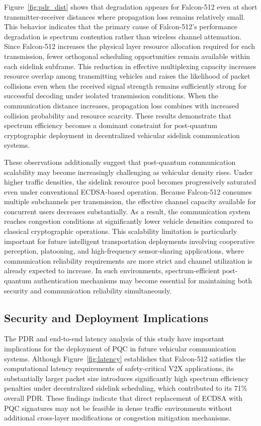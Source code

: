 \documentclass[conference]{IEEEtran}
\begin{document}
Figure~\ref{fig:pdr_dist} shows that degradation appears for Falcon-512 even at short transmitter-receiver distances where propagation loss remains relatively small. This behavior indicates that the primary cause of Falcon-512's performance degradation is spectrum contention rather than wireless channel attenuation. Since Falcon-512 increases the physical layer resource allocation required for each transmission, fewer orthogonal scheduling opportunities remain available within each sidelink subframe. This reduction in effective multiplexing capacity increases resource overlap among transmitting vehicles and raises the likelihood of packet collisions even when the received signal strength remains sufficiently strong for successful decoding under isolated transmission conditions. When the communication distance increases, propagation loss combines with increased collision probability and resource scarcity. These results demonstrate that spectrum efficiency becomes a dominant constraint for post-quantum cryptographic deployment in decentralized vehicular sidelink communication systems.

These observations additionally suggest that post-quantum communication scalability may become increasingly challenging as vehicular density rises. Under higher traffic densities, the sidelink resource pool becomes progressively saturated even under conventional ECDSA-based operation. Because Falcon-512 consumes multiple subchannels per transmission, the effective channel capacity available for concurrent users decreases substantially. As a result, the communication system reaches congestion conditions at significantly lower vehicle densities compared to classical cryptographic operations. This scalability limitation is particularly important for future intelligent transportation deployments involving cooperative perception, platooning, and high-frequency sensor-sharing applications, where communication reliability requirements are more strict and channel utilization is already expected to increase. In such environments, spectrum-efficient post-quantum authentication mechanisms may become essential for maintaining both security and communication reliability simultaneously.

\subsection{Security and Deployment Implications}
\label{sec:security}
The PDR and end-to-end latency analysis of this study have important implications for the deployment of PQC in future vehicular communication systems. Although Figure~\ref{fig:latency} establishes that Falcon-512 satisfies the computational latency requirements of safety-critical V2X applications, its substantially larger packet size introduces significantly high spectrum efficiency penalties under decentralized sidelink scheduling, which contributed to its 71\% overall PDR. These findings indicate that direct replacement of ECDSA with PQC signatures may not be feasible in dense traffic environments without additional cross-layer modifications or congestion mitigation mechanisms.
\end{document}
